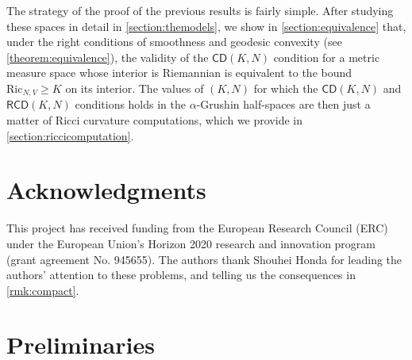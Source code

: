 \documentclass[11pt,twoside,a4paper]{article}
\theoremstyle{theorem}
\theoremstyle{definition}
\theoremstyle{remark}
\theoremstyle{proof}
\begin{document}
The strategy of the proof of the previous results is fairly simple. After studying these spaces in detail in \cref{section:themodels}, we show in \cref{section:equivalence} that, under the right conditions of smoothness and geodesic convexity (see \cref{theorem:equivalence}), the validity of the $\mathsf{CD}(K, N)$ condition for a metric measure space whose interior is Riemannian is equivalent to the bound $\mathrm{Ric}_{N,V} \geq K$ on its interior. The values of $(K, N)$ for which the $\mathsf{CD}(K, N)$ and $\mathsf{RCD}(K, N)$ conditions holds in the $\alpha$-Grushin half-spaces are then just a matter of Ricci curvature computations, which we provide in \cref{section:riccicomputation}.

\section*{Acknowledgments}
This project has received funding from the European Research Council (ERC) under the European Union’s Horizon 2020 research and innovation program (grant agreement No. 945655).
The authors thank Shouhei Honda for leading the authors' attention to these problems, and telling us the consequences in \cref{rmk:compact}.

\section{Preliminaries}
\end{document}
